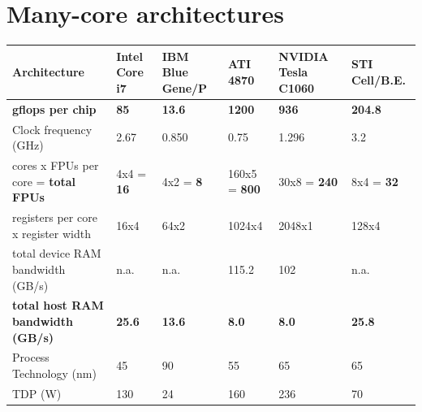 \documentclass{article}
\begin{document}
\section{Many-core architectures}

\begin{table}[t]
\begin{center}
{\small
\begin{tabular}{|l|l|l|l|l|l|}                                                   
\hline
Architecture                                 & Intel Core i7 & IBM Blue Gene/P& ATI 4870 &  NVIDIA Tesla C1060 & STI Cell/B.E. \\
\hline
\textbf{gflops per chip}                     & \textbf{85}   & \textbf{13.6}  & \textbf{1200}  & \textbf{936}  & \textbf{204.8}\\
Clock frequency (GHz)                        & 2.67          & 0.850          & 0.75           & 1.296         & 3.2           \\
cores x FPUs per core = \textbf{total FPUs}  & 4x4 = \textbf{16} & 4x2 = \textbf{8} & 160x5 = \textbf{800} & 30x8 = \textbf{240} & 8x4 = \textbf{32} \\
registers per core x register width          & 16x4          & 64x2           & 1024x4        & 2048x1         & 128x4         \\
total device RAM bandwidth (GB/s)            & n.a.          & n.a.           & 115.2         & 102            & n.a.          \\
\textbf{total host RAM bandwidth (GB/s)}     & \textbf{25.6} & \textbf{13.6}  & \textbf{8.0}  & \textbf{8.0}   & \textbf{25.8} \\
Process Technology (nm)                      & 45            & 90             & 55            & 65             & 65            \\
TDP (W)                                      & 130           & 24             & 160           & 236            & 70            \\

\end{tabular}}
\end{center}
\end{table}
\end{document}
